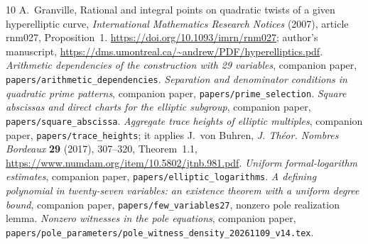 \documentclass[11pt,a4paper]{article}
\begin{document}
\begin{thebibliography}{10}
A.~Granville, Rational and integral points on quadratic twists of a given
hyperelliptic curve, \emph{International Mathematics Research Notices}
(2007), article rnm027, Proposition~1.
\url{https://doi.org/10.1093/imrn/rnm027}; author's manuscript,
\url{https://dms.umontreal.ca/~andrew/PDF/hyperelliptics.pdf}.
\emph{Arithmetic dependencies of the construction with 29 variables},
companion paper, \nolinkurl{papers/arithmetic_dependencies}.
\emph{Separation and denominator conditions in quadratic prime patterns},
companion paper, \nolinkurl{papers/prime_selection}.
\emph{Square abscissas and direct charts for the elliptic subgroup},
companion paper, \nolinkurl{papers/square_abscissa}.
\emph{Aggregate trace heights of elliptic multiples}, companion paper,
\nolinkurl{papers/trace_heights}; it applies J.~von Buhren,
\emph{J. Th\'eor. Nombres Bordeaux} \textbf{29} (2017), 307--320,
Theorem~1.1, \url{https://www.numdam.org/item/10.5802/jtnb.981.pdf}.
\emph{Uniform formal-logarithm estimates}, companion paper,
\nolinkurl{papers/elliptic_logarithms}.
\emph{A defining polynomial in twenty-seven variables: an existence
theorem with a uniform degree bound}, companion paper,
\nolinkurl{papers/few_variables27}, nonzero pole realization lemma.
\emph{Nonzero witnesses in the pole equations}, companion paper,
\nolinkurl{papers/pole_parameters/pole_witness_density_20261109_v14.tex}.
\end{thebibliography}
\end{document}

